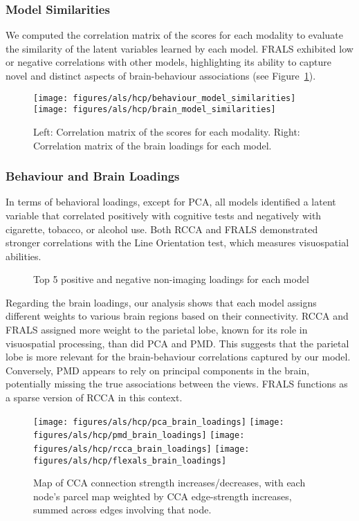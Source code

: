 \subsubsection{Model Similarities}
We computed the correlation matrix of the scores for each modality to evaluate the similarity of the latent variables learned by each model.
FRALS exhibited low or negative correlations with other models, highlighting its ability to capture novel and distinct aspects of brain-behaviour associations (see Figure~\ref{fig:similarities}).

\begin{figure}[h]
\centering
\texttt{[image: figures/als/hcp/behaviour\_model\_similarities]}
\texttt{[image: figures/als/hcp/brain\_model\_similarities]}
\caption{Left: Correlation matrix of the scores for each modality. Right: Correlation matrix of the brain loadings for each model.}
\label{fig:similarities}
\end{figure}


\subsubsection{Behaviour and Brain Loadings}
In terms of behavioral loadings, except for PCA, all models identified a latent variable that correlated positively with cognitive tests and negatively with cigarette, tobacco, or alcohol use.
Both RCCA and FRALS demonstrated stronger correlations with the Line Orientation test, which measures visuospatial abilities.

\begin{figure}[h]
\centering

\caption*{Top 5 positive and negative non-imaging loadings for each model}
\label{fig:behaviour}
\end{figure}

Regarding the brain loadings, our analysis shows that each model assigns different weights to various brain regions
based on their connectivity.
RCCA and FRALS assigned more weight to the parietal lobe, known for its role in visuospatial processing, than did PCA and PMD. This suggests that the parietal lobe is more relevant for the brain-behaviour correlations captured by our model.
Conversely, PMD appears to rely on principal components in the brain, potentially missing the true associations between the views.
FRALS functions as a sparse version of RCCA in this context.

\begin{figure}[h]
\centering
\texttt{[image: figures/als/hcp/pca\_brain\_loadings]}
\texttt{[image: figures/als/hcp/pmd\_brain\_loadings]}
\texttt{[image: figures/als/hcp/rcca\_brain\_loadings]}
\texttt{[image: figures/als/hcp/flexals\_brain\_loadings]}
\caption*{Map of CCA connection strength increases/decreases, with each node’s parcel map weighted by CCA edge-strength increases, summed across edges involving that node.}
\label{fig:brain}
\end{figure}

